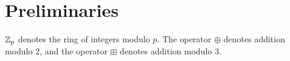 
\section{Preliminaries}
\label{sec:preliminaries}

$\mathbb{Z}_p$ denotes the ring of integers modulo $p$. The operator $\oplus$ denotes addition modulo 2, and the operator $\boxplus$ denotes addition modulo 3. 